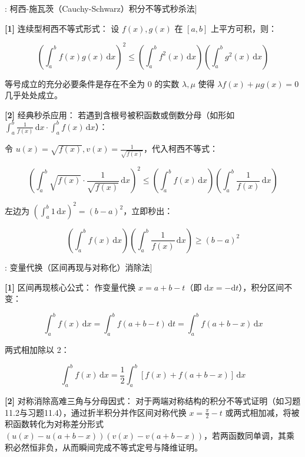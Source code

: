\documentclass[11pt,a4paper,UTF8]{ctexart}
\begin{document}
\begin{thmbox}[方法[9]: 柯西-施瓦茨（Cauchy-Schwarz）积分不等式秒杀法]

\textbf{[1]} 连续型柯西不等式形式：
设 $f(x), g(x)$ 在 $[a, b]$ 上平方可积，则：


\begin{equation*}
\left(\int_a^b f(x)g(x)\,\mathrm{d}x\right)^2 \leqslant \left(\int_a^b f^2(x)\,\mathrm{d}x\right) \left(\int_a^b g^2(x)\,\mathrm{d}x\right)
\end{equation*}


等号成立的充分必要条件是存在不全为 0 的实数 $\lambda, \mu$ 使得 $\lambda f(x) + \mu g(x) = 0$ 几乎处处成立。

\textbf{[2]} 经典秒杀应用：
若遇到含根号被积函数或倒数分母（如形如 $\int_a^b \frac{1}{f(x)}\,\mathrm{d}x \cdot \int_a^b f(x)\,\mathrm{d}x$）：

令 $u(x) = \sqrt{f(x)}, v(x) = \frac{1}{\sqrt{f(x)}}$，代入柯西不等式：


\begin{equation*}
\left(\int_a^b \sqrt{f(x)} \cdot \frac{1}{\sqrt{f(x)}}\,\mathrm{d}x\right)^2 \leqslant \left(\int_a^b f(x)\,\mathrm{d}x\right)\left(\int_a^b \frac{1}{f(x)}\,\mathrm{d}x\right)
\end{equation*}


左边为 $\left(\int_a^b 1\,\mathrm{d}x\right)^2 = (b-a)^2$，立即秒出：


\begin{equation*}
\left(\int_a^b f(x)\,\mathrm{d}x\right)\left(\int_a^b \frac{1}{f(x)}\,\mathrm{d}x\right) \geqslant (b-a)^2
\end{equation*}


\end{thmbox}
\begin{thmbox}[方法[10]: 变量代换（区间再现与对称化）消除法]

\textbf{[1]} 区间再现核心公式：
作变量代换 $x = a + b - t$（即 $\mathrm{d}x = -\mathrm{d}t$），积分区间不变：


\begin{equation*}
\int_a^b f(x)\,\mathrm{d}x = \int_a^b f(a+b-t)\,\mathrm{d}t = \int_a^b f(a+b-x)\,\mathrm{d}x
\end{equation*}


两式相加除以 2：


\begin{equation*}
\int_a^b f(x)\,\mathrm{d}x = \frac{1}{2}\int_a^b [f(x) + f(a+b-x)]\,\mathrm{d}x
\end{equation*}


\textbf{[2]} 对称消除高难三角与分母因式：
对于两端对称结构的积分不等式证明（如习题11.2与习题11.4），通过折半积分并作区间对称代换 $x = \frac{\pi}{2}-t$ 或两式相加减，将被积函数转化为对称差分形式 $(u(x) - u(a+b-x))(v(x) - v(a+b-x))$，若两函数同单调，其乘积必然恒非负，从而瞬间完成不等式定号与降维证明。
\end{thmbox}
\end{document}

